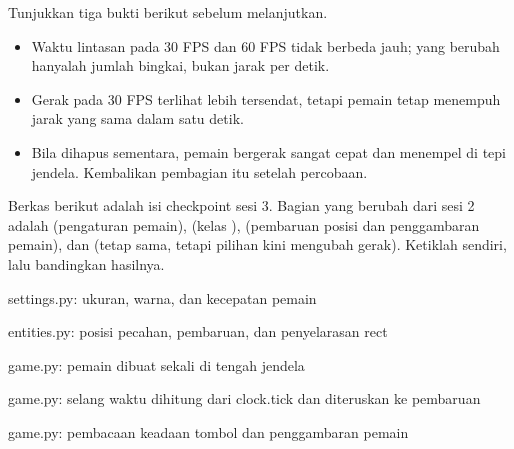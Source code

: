 \begin{ujibox}
Tunjukkan tiga bukti berikut sebelum melanjutkan.
\begin{itemize}[leftmargin=1.4em, itemsep=0.2em]
  \item Waktu lintasan pada 30 FPS dan 60 FPS tidak berbeda jauh; yang berubah
        hanyalah jumlah bingkai, bukan jarak per detik.
  \item Gerak pada 30 FPS terlihat lebih tersendat, tetapi pemain tetap
        menempuh jarak yang sama dalam satu detik.
  \item Bila  dihapus sementara, pemain bergerak sangat cepat
        dan menempel di tepi jendela. Kembalikan pembagian itu setelah
        percobaan.
\end{itemize}
\end{ujibox}


Berkas berikut adalah isi checkpoint sesi 3. Bagian yang berubah dari sesi 2
adalah  (pengaturan pemain),  (kelas
),  (pembaruan posisi dan penggambaran pemain), dan
 (tetap sama, tetapi pilihan  kini mengubah gerak).
Ketiklah sendiri, lalu bandingkan hasilnya.

  {settings.py: ukuran, warna, dan kecepatan pemain}

  {entities.py: posisi pecahan, pembaruan, dan penyelarasan rect}

  {game.py: pemain dibuat sekali di tengah jendela}

  {game.py: selang waktu dihitung dari clock.tick dan diteruskan ke pembaruan}

  {game.py: pembacaan keadaan tombol dan penggambaran pemain}



